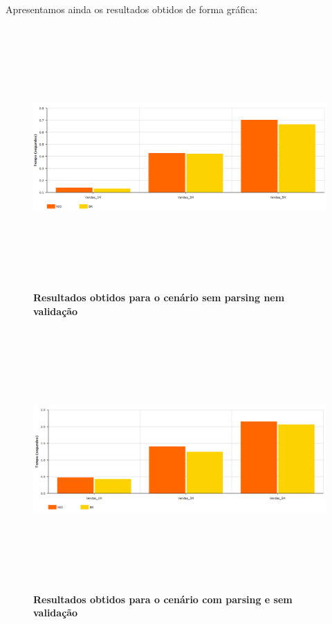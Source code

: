 \documentclass[11pt]{article}
\begin{document}
Apresentamos ainda os resultados obtidos de forma gráfica:
\begin{figure}[H]
    \centering
    \includegraphics[width=\textwidth,height=10cm]{images/nio_vs_br_no_pv.png}
    \caption{\textbf{Resultados obtidos para o cenário sem parsing nem validação}}
\end{figure}
\begin{figure}[H]
    \centering
    \includegraphics[width=\textwidth,height=10cm]{images/nio_vs_br_p_no_v.png}
    \caption{\textbf{Resultados obtidos para o cenário com parsing e sem validação}}
\end{figure}
\end{document}
